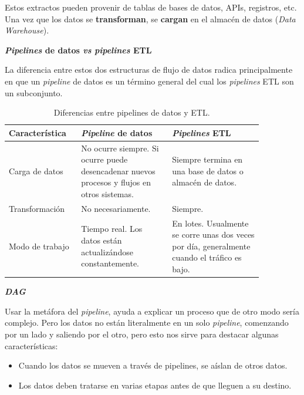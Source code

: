 \documentclass[a4paper,12pt]{article}
\begin{document}
		Estos extractos pueden provenir de tablas de bases de datos, APIs, registros, etc. Una vez que los datos se \textbf{transforman}, se \textbf{cargan} en el almacén de datos (\textit{Data Warehouse}).
				
		\textbf{\textit{Pipelines} de datos \textit{vs} \textit{pipelines} ETL}
				
		La diferencia entre estos dos estructuras de flujo de datos radica principalmente en que un \textit{pipeline} de datos es un término general del cual los \textit{pipelines} ETL son un subconjunto. \citep{Tobin2020Jun}
				
		\begin{table}[H]
			\centering
			\begin{tabular}{p{0.22\linewidth}|p{0.32\linewidth}|p{0.32\linewidth}}
				\hline
				\textbf{Característica} & \textbf{\textit{Pipeline} de datos} & \textbf{\textit{Pipelines} ETL} \\ \hline
				Carga de datos &
				No ocurre siempre. Si ocurre puede desencadenar nuevos procesos y flujos en otros sistemas. &
				Siempre termina en una base de datos o almacén de datos. \\
				Transformación          & No necesariamente.                  & Siempre.                        \\
				Modo de trabajo &
				Tiempo real. Los datos están actualizándose constantemente. &
				En lotes. Usualmente se corre unas dos veces por día, generalmente cuando el tráfico es bajo. \\ \hline
			\end{tabular}
			\caption{Diferencias entre pipelines de datos y ETL.}
			\label{tab:pipelines-table}
		\end{table}
				
		\textbf{\textit{DAG}}
				
		Usar la metáfora del \textit{pipeline}, ayuda a explicar un proceso que de otro modo sería complejo. Pero los datos no están literalmente en un solo \textit{pipeline}, comenzando por un lado y saliendo por el otro, pero esto nos sirve para destacar algunas características: \citep{astronomer}
		\begin{itemize}[noitemsep, topsep=2pt]
			\item Cuando los datos se mueven a través de pipelines, se aíslan de otros datos.
			\item Los datos deben tratarse en varias etapas antes de que lleguen a su destino.
		\end{itemize}
				
\end{document}
